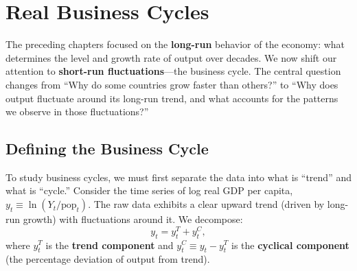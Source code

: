 \chapter{Real Business Cycles}

The preceding chapters focused on the \textbf{long-run} behavior of the economy: what determines the level and growth rate of output over decades. We now shift our attention to \textbf{short-run fluctuations}---the business cycle. The central question changes from ``Why do some countries grow faster than others?'' to ``Why does output fluctuate around its long-run trend, and what accounts for the patterns we observe in those fluctuations?''

\section{Defining the Business Cycle}

To study business cycles, we must first separate the data into what is ``trend'' and what is ``cycle.'' Consider the time series of log real GDP per capita, $y_t \equiv \ln(Y_t/\text{pop}_t)$. The raw data exhibits a clear upward trend (driven by long-run growth) with fluctuations around it. We decompose:
$$
y_t = y_t^T + y_t^C,
$$
where $y_t^T$ is the \textbf{trend component} and $y_t^C \equiv y_t - y_t^T$ is the \textbf{cyclical component} (the percentage deviation of output from trend).

\begin{center}
\end{center}

